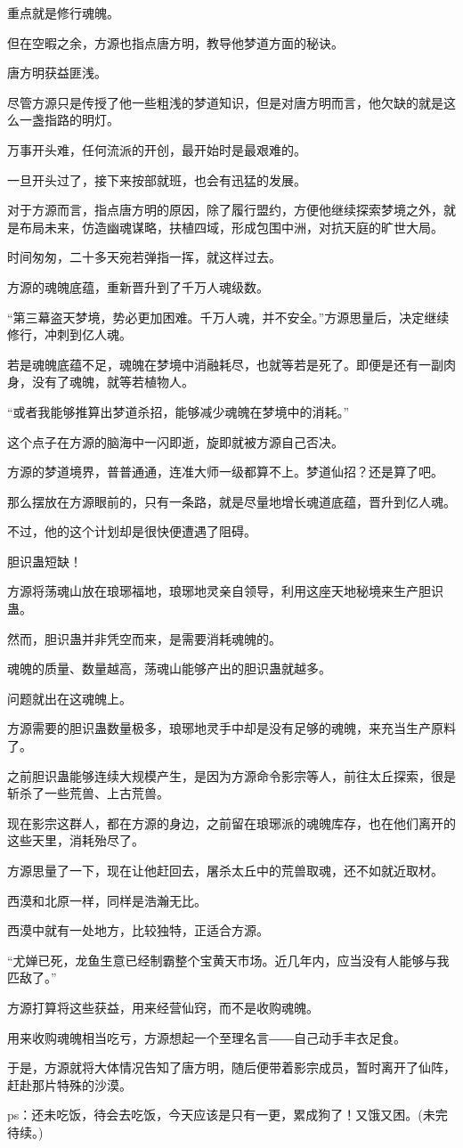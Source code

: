 \begin{this_body}
重点就是修行魂魄。

但在空暇之余，方源也指点唐方明，教导他梦道方面的秘诀。

唐方明获益匪浅。

尽管方源只是传授了他一些粗浅的梦道知识，但是对唐方明而言，他欠缺的就是这么一盏指路的明灯。

万事开头难，任何流派的开创，最开始时是最艰难的。

一旦开头过了，接下来按部就班，也会有迅猛的发展。

对于方源而言，指点唐方明的原因，除了履行盟约，方便他继续探索梦境之外，就是布局未来，仿造幽魂谋略，扶植四域，形成包围中洲，对抗天庭的旷世大局。

时间匆匆，二十多天宛若弹指一挥，就这样过去。

方源的魂魄底蕴，重新晋升到了千万人魂级数。

“第三幕盗天梦境，势必更加困难。千万人魂，并不安全。”方源思量后，决定继续修行，冲刺到亿人魂。

若是魂魄底蕴不足，魂魄在梦境中消融耗尽，也就等若是死了。即便是还有一副肉身，没有了魂魄，就等若植物人。

“或者我能够推算出梦道杀招，能够减少魂魄在梦境中的消耗。”

这个点子在方源的脑海中一闪即逝，旋即就被方源自己否决。

方源的梦道境界，普普通通，连准大师一级都算不上。梦道仙招？还是算了吧。

那么摆放在方源眼前的，只有一条路，就是尽量地增长魂道底蕴，晋升到亿人魂。

不过，他的这个计划却是很快便遭遇了阻碍。

胆识蛊短缺！

方源将荡魂山放在琅琊福地，琅琊地灵亲自领导，利用这座天地秘境来生产胆识蛊。

然而，胆识蛊并非凭空而来，是需要消耗魂魄的。

魂魄的质量、数量越高，荡魂山能够产出的胆识蛊就越多。

问题就出在这魂魄上。

方源需要的胆识蛊数量极多，琅琊地灵手中却是没有足够的魂魄，来充当生产原料了。

之前胆识蛊能够连续大规模产生，是因为方源命令影宗等人，前往太丘探索，很是斩杀了一些荒兽、上古荒兽。

现在影宗这群人，都在方源的身边，之前留在琅琊派的魂魄库存，也在他们离开的这些天里，消耗殆尽了。

方源思量了一下，现在让他赶回去，屠杀太丘中的荒兽取魂，还不如就近取材。

西漠和北原一样，同样是浩瀚无比。

西漠中就有一处地方，比较独特，正适合方源。

“尤婵已死，龙鱼生意已经制霸整个宝黄天市场。近几年内，应当没有人能够与我匹敌了。”

方源打算将这些获益，用来经营仙窍，而不是收购魂魄。

用来收购魂魄相当吃亏，方源想起一个至理名言――自己动手丰衣足食。

于是，方源就将大体情况告知了唐方明，随后便带着影宗成员，暂时离开了仙阵，赶赴那片特殊的沙漠。

ps：还未吃饭，待会去吃饭，今天应该是只有一更，累成狗了！又饿又困。(未完待续。)

\end{this_body}

